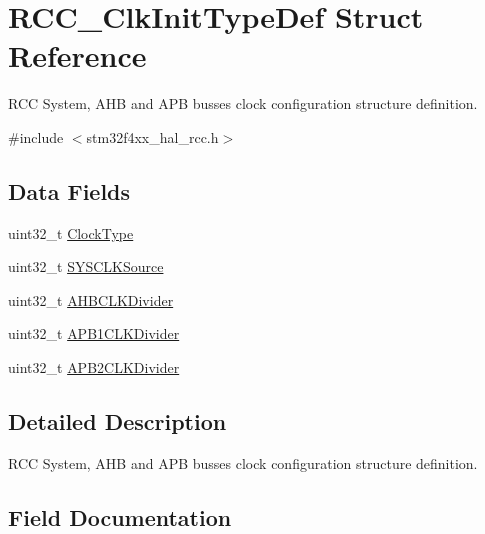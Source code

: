 \hypertarget{struct_r_c_c___clk_init_type_def}{}\section{R\+C\+C\+\_\+\+Clk\+Init\+Type\+Def Struct Reference}
\label{struct_r_c_c___clk_init_type_def}


R\+CC System, A\+HB and A\+PB busses clock configuration structure definition.  




{\ttfamily \#include $<$stm32f4xx\+\_\+hal\+\_\+rcc.\+h$>$}

\subsection*{Data Fields}
\begin{DoxyCompactItemize}
\item 
uint32\+\_\+t \hyperlink{struct_r_c_c___clk_init_type_def_a93a53676a1cfc5b55b8b990e7ff4dac5}{Clock\+Type}
\item 
uint32\+\_\+t \hyperlink{struct_r_c_c___clk_init_type_def_a4ceff1fdbf423e347c63052ca2c1d7e1}{S\+Y\+S\+C\+L\+K\+Source}
\item 
uint32\+\_\+t \hyperlink{struct_r_c_c___clk_init_type_def_abd9bcaa8dcf4b816462ee2930ab3e993}{A\+H\+B\+C\+L\+K\+Divider}
\item 
uint32\+\_\+t \hyperlink{struct_r_c_c___clk_init_type_def_a21ceb024102adc3c4dc7eb270cf02ebd}{A\+P\+B1\+C\+L\+K\+Divider}
\item 
uint32\+\_\+t \hyperlink{struct_r_c_c___clk_init_type_def_aa75c110cd93855d49249f38da8cf94f7}{A\+P\+B2\+C\+L\+K\+Divider}
\end{DoxyCompactItemize}


\subsection{Detailed Description}
R\+CC System, A\+HB and A\+PB busses clock configuration structure definition. 

\subsection{Field Documentation}
\mbox{\label{struct_r_c_c___clk_init_type_def_abd9bcaa8dcf4b816462ee2930ab3e993}} 
